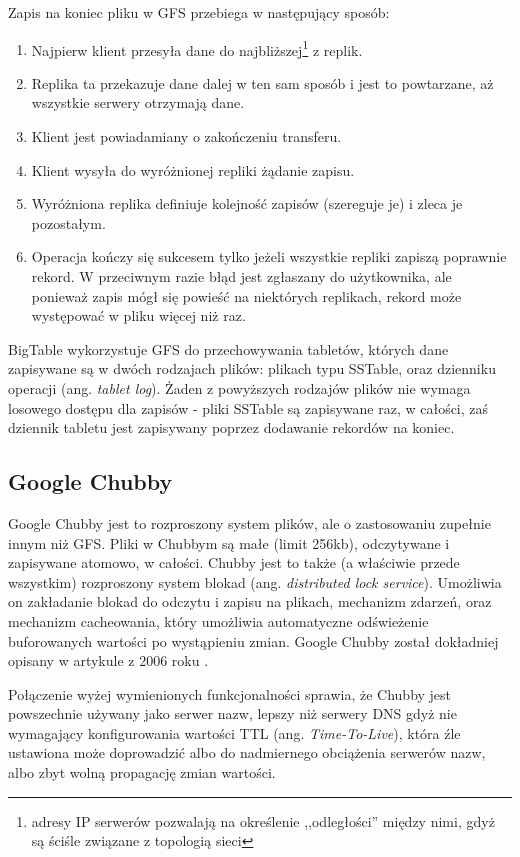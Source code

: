 Zapis na koniec pliku w GFS przebiega w następujący sposób: 
\begin{enumerate}
 \item Najpierw klient przesyła dane do najbliższej\footnote{adresy IP serwerów pozwalają na określenie ,,odległości'' między nimi, gdyż są ściśle związane z topologią sieci} z replik.
 \item Replika ta przekazuje dane dalej w ten sam sposób i jest to powtarzane, aż wszystkie serwery otrzymają dane.
 \item Klient jest powiadamiany o zakończeniu transferu.
 \item Klient wysyła do wyróżnionej repliki żądanie zapisu.
 \item Wyróżniona replika definiuje kolejność zapisów (szereguje je) i zleca je pozostałym.
 \item Operacja kończy się sukcesem tylko jeżeli wszystkie repliki zapiszą poprawnie rekord.
 W przeciwnym razie błąd jest zgłaszany do użytkownika, ale ponieważ zapis mógł się powieść na niektórych replikach, rekord może występować w pliku więcej niż raz.
\end{enumerate}

BigTable wykorzystuje GFS do przechowywania tabletów, których dane zapisywane są w dwóch rodzajach plików: plikach typu SSTable, oraz dzienniku operacji (ang. \emph{tablet log}).
Żaden z powyższych rodzajów plików nie wymaga losowego dostępu dla zapisów - pliki SSTable są zapisywane raz, w całości, zaś dziennik tabletu jest zapisywany poprzez dodawanie rekordów na koniec.

\subsection*{Google Chubby}

Google Chubby jest to rozproszony system plików, ale o zastosowaniu zupełnie innym niż GFS.
Pliki w Chubbym są małe (limit 256kb), odczytywane i zapisywane atomowo, w całości.
Chubby jest to także (a właściwie przede wszystkim) rozproszony system blokad (ang. \emph{distributed lock service}).
Umożliwia on zakładanie blokad do odczytu i zapisu na plikach, mechanizm zdarzeń, oraz mechanizm cacheowania, który umożliwia automatyczne odświeżenie buforowanych wartości po wystąpieniu zmian.
Google Chubby został dokładniej opisany w artykule z 2006 roku \cite{google-chubby}.

Połączenie wyżej wymienionych funkcjonalności sprawia, że Chubby jest powszechnie używany jako serwer nazw, lepszy niż serwery DNS gdyż nie wymagający konfigurowania wartości TTL (ang. \emph{Time-To-Live}), która źle ustawiona może doprowadzić albo do nadmiernego obciążenia serwerów nazw, albo zbyt wolną propagację zmian wartości.

